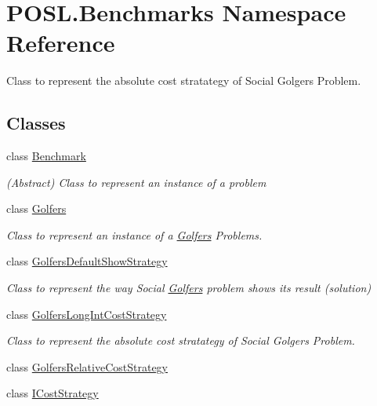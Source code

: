 \hypertarget{namespacePOSL_1_1Benchmarks}{}\section{P\+O\+S\+L.\+Benchmarks Namespace Reference}
\label{namespacePOSL_1_1Benchmarks}


Class to represent the absolute cost stratategy of Social Golgers Problem.  


\subsection*{Classes}
\begin{DoxyCompactItemize}
\item 
class \hyperlink{classPOSL_1_1Benchmarks_1_1Benchmark}{Benchmark}
\begin{DoxyCompactList}\small\item\em (Abstract) Class to represent an instance of a problem \end{DoxyCompactList}\item 
class \hyperlink{classPOSL_1_1Benchmarks_1_1Golfers}{Golfers}
\begin{DoxyCompactList}\small\item\em Class to represent an instance of a \hyperlink{classPOSL_1_1Benchmarks_1_1Golfers}{Golfers} Problems. \end{DoxyCompactList}\item 
class \hyperlink{classPOSL_1_1Benchmarks_1_1GolfersDefaultShowStrategy}{Golfers\+Default\+Show\+Strategy}
\begin{DoxyCompactList}\small\item\em Class to represent the way Social \hyperlink{classPOSL_1_1Benchmarks_1_1Golfers}{Golfers} problem shows its result (solution) \end{DoxyCompactList}\item 
class \hyperlink{classPOSL_1_1Benchmarks_1_1GolfersLongIntCostStrategy}{Golfers\+Long\+Int\+Cost\+Strategy}
\begin{DoxyCompactList}\small\item\em Class to represent the absolute cost stratategy of Social Golgers Problem. \end{DoxyCompactList}\item 
class \hyperlink{classPOSL_1_1Benchmarks_1_1GolfersRelativeCostStrategy}{Golfers\+Relative\+Cost\+Strategy}
\item 
class \hyperlink{interfacePOSL_1_1Benchmarks_1_1ICostStrategy}{I\+Cost\+Strategy}

\end{DoxyCompactItemize}
